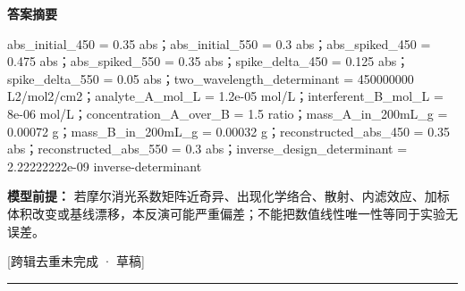 \documentclass[UTF8,11pt,a4paper]{ctexart}
\begin{document}
\noindent\textbf{答案摘要}\par
abs\_initial\_450 = 0.35 abs；abs\_initial\_550 = 0.3 abs；abs\_spiked\_450 = 0.475 abs；abs\_spiked\_550 = 0.35 abs；spike\_delta\_450 = 0.125 abs；spike\_delta\_550 = 0.05 abs；two\_wavelength\_determinant = 450000000 L2/mol2/cm2；analyte\_A\_mol\_L = 1.2e-05 mol/L；interferent\_B\_mol\_L = 8e-06 mol/L；concentration\_A\_over\_B = 1.5 ratio；mass\_A\_in\_200mL\_g = 0.00072 g；mass\_B\_in\_200mL\_g = 0.00032 g；reconstructed\_abs\_450 = 0.35 abs；reconstructed\_abs\_550 = 0.3 abs；inverse\_design\_determinant = 2.22222222e-09 inverse-determinant\par
\noindent\textbf{模型前提：}
若摩尔消光系数矩阵近奇异、出现化学络合、散射、内滤效应、加标体积改变或基线漂移，本反演可能严重偏差；不能把数值线性唯一性等同于实验无误差。\par
\noindent\textcolor{red!65!black}{[跨辑去重未完成 · 草稿]} \par
\medskip\hrule\medskip
{}
\end{document}
